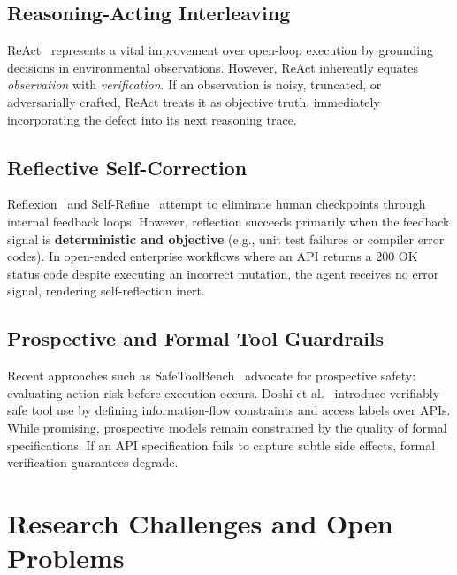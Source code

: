 \documentclass[conference]{IEEEtran}
\begin{document}
\subsection{Reasoning-Acting Interleaving}
ReAct~\cite{yao2023react} represents a vital improvement over open-loop execution by grounding decisions in environmental observations. However, ReAct inherently equates \textit{observation} with \textit{verification}. If an observation is noisy, truncated, or adversarially crafted, ReAct treats it as objective truth, immediately incorporating the defect into its next reasoning trace.

\subsection{Reflective Self-Correction}
Reflexion~\cite{shinn2023reflexion} and Self-Refine~\cite{madaan2023selfrefine} attempt to eliminate human checkpoints through internal feedback loops. However, reflection succeeds primarily when the feedback signal is \textbf{deterministic and objective} (e.g., unit test failures or compiler error codes). In open-ended enterprise workflows where an API returns a 200 OK status code despite executing an incorrect mutation, the agent receives no error signal, rendering self-reflection inert.

\subsection{Prospective and Formal Tool Guardrails}
Recent approaches such as SafeToolBench~\cite{xia2025safetoolbench} advocate for prospective safety: evaluating action risk before execution occurs. Doshi et al.~\cite{doshi2026towards} introduce verifiably safe tool use by defining information-flow constraints and access labels over APIs. While promising, prospective models remain constrained by the quality of formal specifications. If an API specification fails to capture subtle side effects, formal verification guarantees degrade.

\section{Research Challenges and Open Problems}
\end{document}
